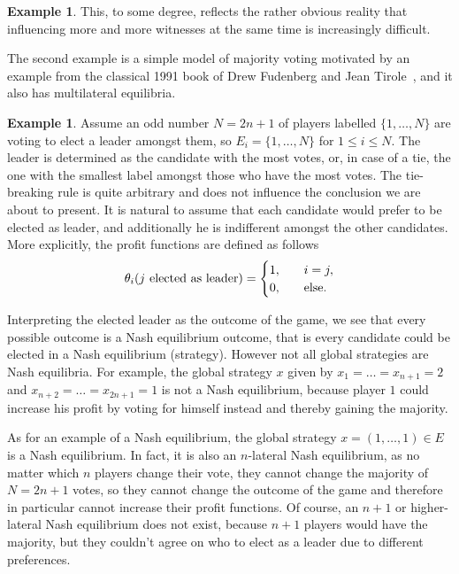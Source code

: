 \documentclass[a4paper,11pt,reqno,english]{amsart}
\theoremstyle{plain}
\theoremstyle{definition}
\newtheorem{example}[theorem]{Example}
\begin{document}
\begin{example}
	\medskip
	This, to some degree, reflects the rather obvious reality that influencing more and more witnesses at the same time is increasingly difficult.
\end{example}

\medskip
The second example is a simple model of majority voting motivated by an example from the classical 1991 book of Drew Fudenberg and Jean Tirole~\cite{FudenbergTirole1991}, and it also has multilateral equilibria.

\begin{example}\label{ex:MajorityVoting}
	Assume an odd number $N=2n+1$ of players labelled $\{1,\dots,N\}$ are voting to elect a leader amongst them, so $E_i = \{1,\dots,N\}$ for $1\leq i\leq N$.
	The leader is determined as the candidate with the most votes, or, in case of a tie, the one with the smallest label amongst those who have the most votes.
	The tie-breaking rule is quite arbitrary and does not influence the conclusion we are about to present.
	It is natural to assume that each candidate would prefer to be elected as leader, and additionally he is indifferent amongst the other candidates. More explicitly, the profit functions are defined as follows
	\begin{displaymath}
		\theta_i(\textit{$j$\text{ \rm  elected as leader}}) = \begin{cases}
			1, \quad & i=j,         \\
			0, \quad & \text{else}.
		\end{cases}
	\end{displaymath}

	\medskip
	Interpreting the elected leader as the outcome of the game, we see that every possible outcome is a Nash equilibrium outcome, that is every candidate could be elected in a Nash equilibrium (strategy).
	However not all global strategies are Nash equilibria.
	For example, the global strategy $x$ given by $x_1=\dots=x_{n+1} = 2$ and $x_{n+2}=\dots=x_{2n+1} = 1$ is not a Nash equilibrium, because player $1$ could increase his profit by voting for himself instead and thereby gaining the majority.

	\medskip
	As for an example of a Nash equilibrium, the global strategy $x = (1,\dots,1)\in E$ is a Nash equilibrium. In fact, it is also an $n$-lateral Nash equilibrium, as no matter which $n$ players change their vote, they cannot change the majority of $N = 2n+1$ votes, so they cannot change the outcome of the game and therefore in particular cannot increase their profit functions.
	Of course, an $n+1$ or higher-lateral Nash equilibrium does not exist, because $n+1$ players would have the majority, but they couldn't agree on who to elect as a leader due to different preferences.


\end{example}
\end{document}
